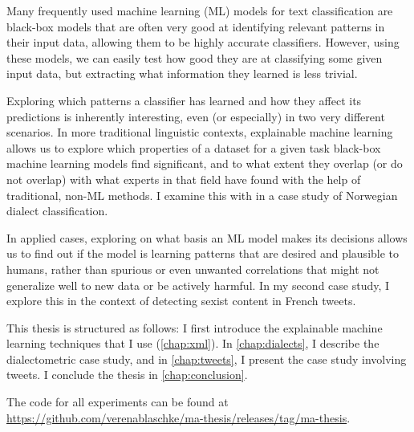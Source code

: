 Many frequently used machine learning (ML) models for text classification are black-box models that are often very good at identifying relevant patterns in their input data, allowing them to be highly accurate classifiers.
However, using these models, we can easily test how good they are at classifying some given input data, but extracting what information they learned is less trivial.

Exploring which patterns a classifier has learned and how they affect its predictions is inherently interesting, even (or especially) in two very different scenarios.
In more traditional linguistic contexts, explainable machine learning allows us to explore which properties of a dataset for a given task black-box machine learning models find significant, and to what extent they overlap (or do not overlap) with what experts in that field have found with the help of traditional, non-ML methods.
I examine this with in a case study of Norwegian dialect classification.

In applied cases, exploring on what basis an ML model makes its decisions allows us to find out if the model is learning patterns that are desired and plausible to humans, rather than spurious or even unwanted correlations that might not generalize well to new data or be actively harmful.
In my second case study, I explore this in the context of detecting sexist content in French tweets.

This thesis is structured as follows:
I first introduce the explainable machine learning techniques that I use (\autoref{chap:xml}).
In \autoref{chap:dialects}, I describe the dialectometric case study, and in \autoref{chap:tweets}, I present the case study involving tweets.
I conclude the thesis in \autoref{chap:conclusion}.

The code for all experiments can be found at \url{https://github.com/verenablaschke/ma-thesis/releases/tag/ma-thesis}.
